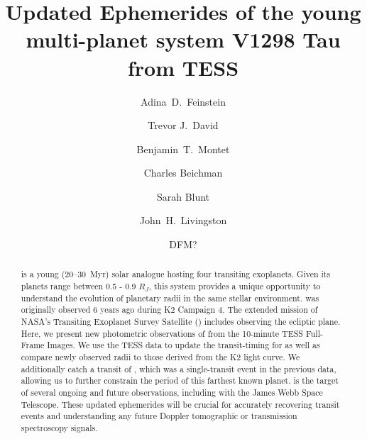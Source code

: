 \documentclass[twocolumn]{aastex631}
\begin{document}
\title{Updated Ephemerides of the young multi-planet system V1298 Tau from TESS}

\author[0000-0002-9464-8101]{Adina~D.~Feinstein}

\author[0000-0001-6534-6246]{Trevor J.\ David}

\author[0000-0001-7516-8308]{Benjamin~T.~Montet}

\author{Charles Beichman}

\author[0000-0002-3199-2888]{Sarah Blunt}


\author[0000-0002-4881-3620]{John~H.~Livingston}


\author{DFM?}

  

\begin{abstract}
\sname is a young (20--30~Myr) solar analogue hosting four transiting exoplanets. Given its planets range between 0.5 - 0.9 $R_J$, this system provides a unique opportunity to understand the evolution of planetary radii in the same stellar environment. \sname was originally observed 6 years ago during K2 Campaign 4. The extended mission of NASA's Transiting Exoplanet Survey Satellite (\tess) includes observing the ecliptic plane. Here, we present new photometric observations of \sname from the 10-minute TESS Full-Frame Images. We use the TESS data to update the transit-timing for \allplanets as well as compare newly observed radii to those derived from the K2 light curve. We additionally catch a transit of \planete, which was a single-transit event in the previous data, allowing us to further constrain the period of this farthest known planet. \sname is the target of several ongoing and future observations, including with the James Webb Space Telescope. These updated ephemerides will be crucial for accurately recovering transit events and understanding any future Doppler tomographic or transmission spectroscopy signals.\end{abstract}
\end{document}
